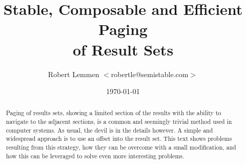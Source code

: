 \documentclass[11pt,a4paper]{article}
\title{Stable, Composable and Efficient Paging\\ of Result Sets}
\author{Robert Lemmen $<$robertle@semistable.com$>$}
\date{\today}
\begin{document}
\maketitle
\bigskip

\begin{abstract}
\noindent Paging of results sets, showing a limited section of the results with
the ability to navigate to the adjacent sections, is a common and seemingly
trivial method used in computer systems. As usual, the devil is in the details
however. A simple and widespread approach is to use an offset into the result
set. This text shows problems resulting from this strategy, how they can be
overcome with a small modification, and how this can be leveraged to solve
even more interesting problems.
\end{abstract}
\vspace{40pt}
\end{document}
